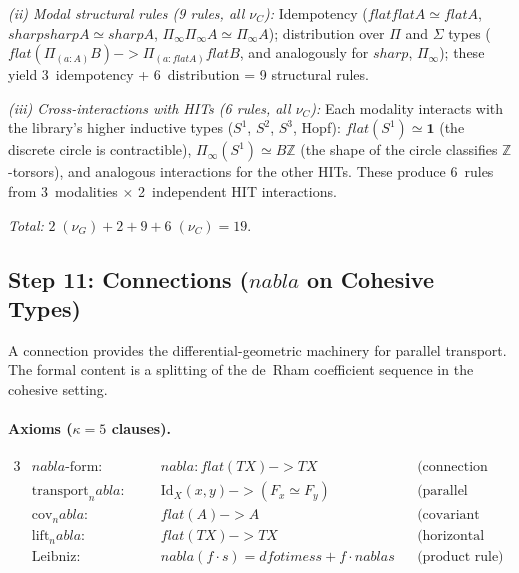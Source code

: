 \documentclass[11pt,a4paper]{article}
\def\to{->}%
\def\otimes{otimes}%
\def\nabla{nabla}%
\def\flat{flat}%
\def\sharp{sharp}%
\theoremstyle{plain}
\theoremstyle{definition}
\theoremstyle{remark}
\newcommand{\Z}{\mathbb{Z}}
\begin{document}
\emph{(ii) Modal structural rules (9 rules, all $\nu_C$):}
Idempotency ($\flat\flat A \simeq \flat A$, $\sharp\sharp A \simeq \sharp A$, $\Pi_{\!\infty}\Pi_{\!\infty} A \simeq \Pi_{\!\infty} A$); distribution over $\Pi$ and $\Sigma$ types ($\flat(\Pi_{(a:A)} B) \to \Pi_{(a:\flat A)} \flat B$, and analogously for $\sharp$, $\Pi_{\!\infty}$); these yield 3~idempotency + 6~distribution = 9 structural rules.

\emph{(iii) Cross-interactions with HITs (6 rules, all $\nu_C$):}
Each modality interacts with the library's higher inductive types ($S^1$, $S^2$, $S^3$, Hopf): $\flat(S^1) \simeq \mathbf{1}$ (the discrete circle is contractible), $\Pi_{\!\infty}(S^1) \simeq B\Z$ (the shape of the circle classifies $\Z$-torsors), and analogous interactions for the other HITs.
These produce 6~rules from 3~modalities $\times$ 2~independent HIT interactions.

\emph{Total:} $2\;(\nu_G) + 2 + 9 + 6\;(\nu_C) = 19$.

\subsection{\texorpdfstring{Step 11: Connections ($\nabla$ on Cohesive Types)}{Step 11: Connections (nabla on Cohesive Types)}}
\label{app:connections-spec}

A connection provides the differential-geometric machinery for parallel transport.
The formal content is a splitting of the de~Rham coefficient sequence in the cohesive setting.

\paragraph{Axioms ($\kappa = 5$ clauses).}
\begin{alignat*}{3}
    &\nabla\text{-form:}        &\quad& \nabla : \flat(TX) \to TX
        && \text{(connection operator)} \\
    &\mathrm{transport}_\nabla\text{:} && \mathrm{Id}_X(x, y) \to (F_x \simeq F_y)
        && \text{(parallel transport)} \\
    &\mathrm{cov}_\nabla\text{:}       && \flat(A) \to A
        && \text{(covariant derivative)} \\
    &\mathrm{lift}_\nabla\text{:}      && \flat(TX) \to TX
        && \text{(horizontal lift)} \\
    &\mathrm{Leibniz}\text{:}          && \nabla(f \cdot s) = df \otimes s + f \cdot \nabla s
        && \text{(product rule)}
\end{alignat*}
\end{document}

